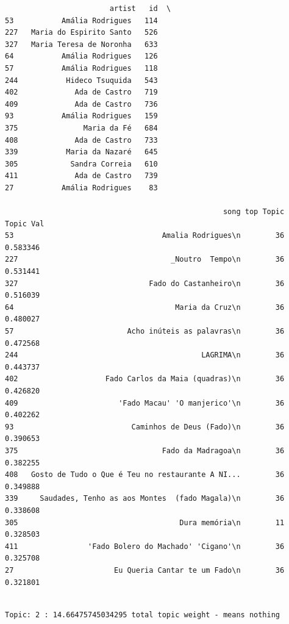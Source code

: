 \documentclass[11pt]{article}
\begin{document}
    
    \begin{verbatim}
                        artist   id  \
53           Amália Rodrigues   114   
227   Maria do Espirito Santo   526   
327   Maria Teresa de Noronha   633   
64           Amália Rodrigues   126   
57           Amália Rodrigues   118   
244           Hideco Tsuquida   543   
402             Ada de Castro   719   
409             Ada de Castro   736   
93           Amália Rodrigues   159   
375               Maria da Fé   684   
408             Ada de Castro   733   
339           Maria da Nazaré   645   
305            Sandra Correia   610   
411             Ada de Castro   739   
27           Amália Rodrigues    83   

                                                  song top Topic  Topic Val  
53                                  Amalia Rodrigues\n        36   0.583346  
227                                   _Noutro  Tempo\n        36   0.531441  
327                              Fado do Castanheiro\n        36   0.516039  
64                                     Maria da Cruz\n        36   0.480027  
57                          Acho inúteis as palavras\n        36   0.472568  
244                                          LAGRIMA\n        36   0.443737  
402                    Fado Carlos da Maia (quadras)\n        36   0.426820  
409                       'Fado Macau' 'O manjerico'\n        36   0.402262  
93                           Caminhos de Deus (Fado)\n        36   0.390653  
375                                 Fado da Madragoa\n        36   0.382255  
408   Gosto de Tudo o Que é Teu no restaurante A NI...        36   0.349888  
339     Saudades, Tenho as aos Montes  (fado Magala)\n        36   0.338608  
305                                     Dura memória\n        11   0.328503  
411                'Fado Bolero do Machado' 'Cigano'\n        36   0.325708  
27                       Eu Queria Cantar te um Fado\n        36   0.321801  
    \end{verbatim}

    
    \begin{Verbatim}[commandchars=\\\{\}]

Topic: 2 : 14.66475745034295 total topic weight - means nothing

    \end{Verbatim}
\end{document}
